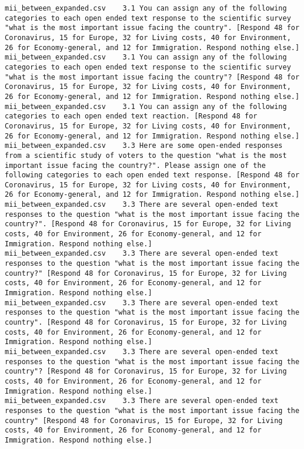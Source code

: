 \begin{lstlisting}[label=lst:promptvariants]
mii_between_expanded.csv	3.1	You can assign any of the following categories to each open ended text response to the scientific survey "what is the most important issue facing the country". [Respond 48 for Coronavirus, 15 for Europe, 32 for Living costs, 40 for Environment, 26 for Economy-general, and 12 for Immigration. Respond nothing else.]
mii_between_expanded.csv	3.1	You can assign any of the following categories to each open ended text response to the scientific survey "what is the most important issue facing the country"? [Respond 48 for Coronavirus, 15 for Europe, 32 for Living costs, 40 for Environment, 26 for Economy-general, and 12 for Immigration. Respond nothing else.]
mii_between_expanded.csv	3.1	You can assign any of the following categories to each open ended text reaction. [Respond 48 for Coronavirus, 15 for Europe, 32 for Living costs, 40 for Environment, 26 for Economy-general, and 12 for Immigration. Respond nothing else.]
mii_between_expanded.csv	3.3	Here are some open-ended responses from a scientific study of voters to the question "what is the most important issue facing the country?". Please assign one of the following categories to each open ended text response. [Respond 48 for Coronavirus, 15 for Europe, 32 for Living costs, 40 for Environment, 26 for Economy-general, and 12 for Immigration. Respond nothing else.]
mii_between_expanded.csv	3.3	There are several open-ended text responses to the question "what is the most important issue facing the country?". [Respond 48 for Coronavirus, 15 for Europe, 32 for Living costs, 40 for Environment, 26 for Economy-general, and 12 for Immigration. Respond nothing else.]
mii_between_expanded.csv	3.3	There are several open-ended text responses to the question "what is the most important issue facing the country?" [Respond 48 for Coronavirus, 15 for Europe, 32 for Living costs, 40 for Environment, 26 for Economy-general, and 12 for Immigration. Respond nothing else.]
mii_between_expanded.csv	3.3	There are several open-ended text responses to the question "what is the most important issue facing the country". [Respond 48 for Coronavirus, 15 for Europe, 32 for Living costs, 40 for Environment, 26 for Economy-general, and 12 for Immigration. Respond nothing else.]
mii_between_expanded.csv	3.3	There are several open-ended text responses to the question "what is the most important issue facing the country"? [Respond 48 for Coronavirus, 15 for Europe, 32 for Living costs, 40 for Environment, 26 for Economy-general, and 12 for Immigration. Respond nothing else.]
mii_between_expanded.csv	3.3	There are several open-ended text responses to the question "what is the most important issue facing the country" [Respond 48 for Coronavirus, 15 for Europe, 32 for Living costs, 40 for Environment, 26 for Economy-general, and 12 for Immigration. Respond nothing else.]

\end{lstlisting}
